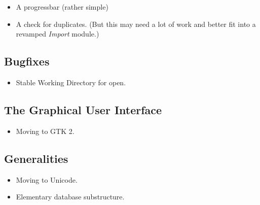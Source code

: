 \begin{itemize}
\item A progressbar (rather simple)
\item \Think A check for duplicates. (But this may need a lot of work
  and better fit into a revamped \textit{Import} module.)
\end{itemize}




\subsection{Bugfixes}
\label{sec:next:fix}

\begin{itemize}
\item Stable Working Directory for open.
\end{itemize}

\subsection*{The Graphical User Interface}
\label{todo:r20:gui}

\begin{itemize}
\item Moving to \textsf{GTK 2}.

\end{itemize}


\subsection{Generalities}
\label{todo:r20:genera}

\begin{itemize}
\item Moving to \textsf{Unicode}.
\item Elementary database substructure.
\end{itemize}


